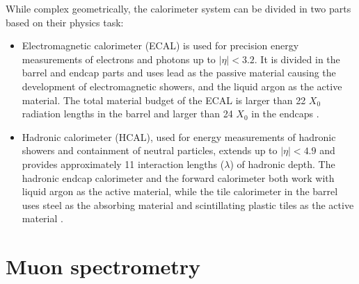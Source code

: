 While complex geometrically, the calorimeter system can be divided
in two parts based on their physics task:
\begin{itemize}
\item Electromagnetic calorimeter (ECAL) is used for precision
energy measurements of electrons and photons up to $|\eta| < 3.2$.
It is divided in the barrel and endcap parts and uses lead as
the passive material causing the development of electromagnetic
showers, and the liquid argon as the active material. The total
material budget of the ECAL is larger than 22 $X_0$ radiation
lengths in the barrel and larger than 24 $X_0$ in the endcaps 
\cite{CERN-LHCC-96-041, Aad:2008zzm}.
\item Hadronic calorimeter (HCAL), used for energy measurements
of hadronic showers and containment of neutral particles, extends
up to $|\eta| < 4.9$ and provides approximately 11 interaction
lengths ($\lambda$) of hadronic depth. The hadronic endcap
calorimeter and the forward calorimeter both work with liquid
argon as the active material, while the tile calorimeter in the
barrel uses steel as the absorbing material and scintillating
plastic tiles as the active material \cite{CERN-LHCC-96-041,
artamonov2008atlas, Aad:2008zzm}.
\end{itemize}

\section{Muon spectrometry}

